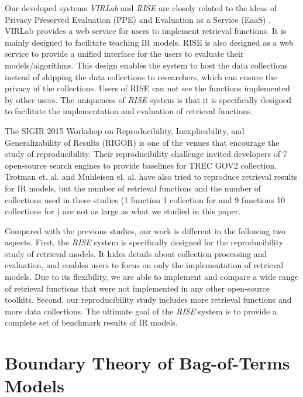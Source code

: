Our developed systems {\em VIRLab} and {\em RISE} are closely related to 
the ideas of Privacy Preserved Evaluation (PPE) \cite{Fang:2014:VWV:2600428.2611178}
and Evaluation as a Service (EaaS) \cite{rao:ecir:2015,Lin:2013:ESI:2568388.2568390,Lin:2014:ISE:2567948.2577014}. 
VIRLab \cite{Fang:2014:VWV:2600428.2611178} provides a web service
for users to implement retrieval functions. It is mainly designed
to facilitate teaching IR models. RISE is also designed as a 
web service to provide a unified interface for the users to evaluate their 
models/algorithms. This design enables the system to host the data 
collections instead of shipping the data collections to researchers, 
which can ensure the privacy of the collections. 
Users of RISE can not see the functions implemented by other users. 
The uniqueness of 
{\em RISE} system is that it is specifically designed to facilitate the 
implementation and evaluation of retrieval functions.  

The SIGIR 2015 Workshop on Reproducibility, Inexplicability, and 
Generalizability of Results (RIGOR) \cite{Hopfgartner:2015:REE:2795403.2795416} 
is one of the venues that encourage the study of reproducibility. 
Their reproducibility challenge invited developers 
of 7 open-source search engines to provide baselines for TREC GOV2 
collection.
Trotman et. al. \cite{adcs14} and Muhleisen el. al. \cite{Muhleisen:2014:ODG:2600428.2609460} 
have also tried to reproduce retrieval results for IR models, but the
number of retrieval functions and the number of collections used in these studies 
(1 function 1 collection for \cite{adcs14} and 9 functions  
10 collections for \cite{Muhleisen:2014:ODG:2600428.2609460})
are not as large as what we studied in this paper. 

Compared with the previous studies, our work is different in the following
two aspects. First, the {\em RISE} system is specifically designed for 
the reproducibility study of retrieval models. It hides details about 
collection processing and evaluation, and enables users to focus on 
only the implementation of retrieval models. Due to its flexibility, 
we are able to implement and compare a wide range of retrieval functions 
that were not implemented in any other open-source toolkits. Second, 
our reproducibility study includes more retrieval functions and more data 
collections. The ultimate goal of the {\em RISE} system is to provide 
a complete set of benchmark results of IR models. 


\section{Boundary Theory of Bag-of-Terms Models}


